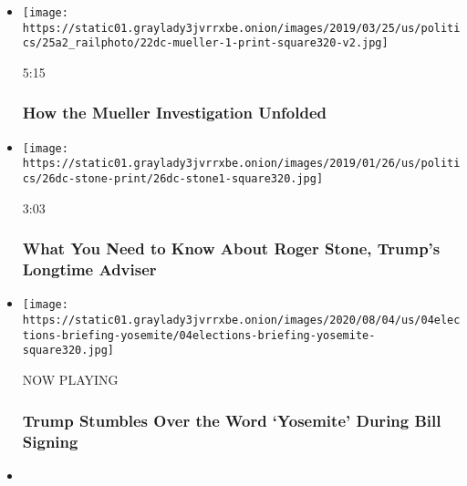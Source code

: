 \begin{itemize}
\item
  \href{https://www.nytimes3xbfgragh.onion/video/us/politics/100000006381390/robert-mueller-report-background.html?action=click\&module=video-series-bar\&region=header\&pgtype=Article\&playlistId=video/us-politics}{}

  \texttt{[image: https://static01.graylady3jvrrxbe.onion/images/2019/03/25/us/politics/25a2\_railphoto/22dc-mueller-1-print-square320-v2.jpg]}

  5:15

  \hypertarget{how-the-mueller-investigation-unfolded}{%
  \subsubsection{How the Mueller Investigation
  Unfolded}\label{how-the-mueller-investigation-unfolded}}
\item
  \href{https://www.nytimes3xbfgragh.onion/video/us/politics/100000006236443/who-is-roger-stone.html?action=click\&module=video-series-bar\&region=header\&pgtype=Article\&playlistId=video/us-politics}{}

  \texttt{[image: https://static01.graylady3jvrrxbe.onion/images/2019/01/26/us/politics/26dc-stone-print/26dc-stone1-square320.jpg]}

  3:03

  \hypertarget{what-you-need-to-know-about-roger-stone-trumps-longtime-adviser}{%
  \subsubsection{What You Need to Know About Roger Stone, Trump's
  Longtime
  Adviser}\label{what-you-need-to-know-about-roger-stone-trumps-longtime-adviser}}
\item
  \texttt{[image: https://static01.graylady3jvrrxbe.onion/images/2020/08/04/us/04elections-briefing-yosemite/04elections-briefing-yosemite-square320.jpg]}

  NOW PLAYING

  \hypertarget{trump-stumbles-over-the-word-yosemite-during-bill-signing-2}{%
  \subsubsection{Trump Stumbles Over the Word `Yosemite' During Bill
  Signing}\label{trump-stumbles-over-the-word-yosemite-during-bill-signing-2}}
\item
  \href{https://www.nytimes3xbfgragh.onion/video/us/100000007267362/white-house-mail-in-ballots-election.html?action=click\&module=video-series-bar\&region=header\&pgtype=Article\&playlistId=video/us-politics}{}


\end{itemize}

